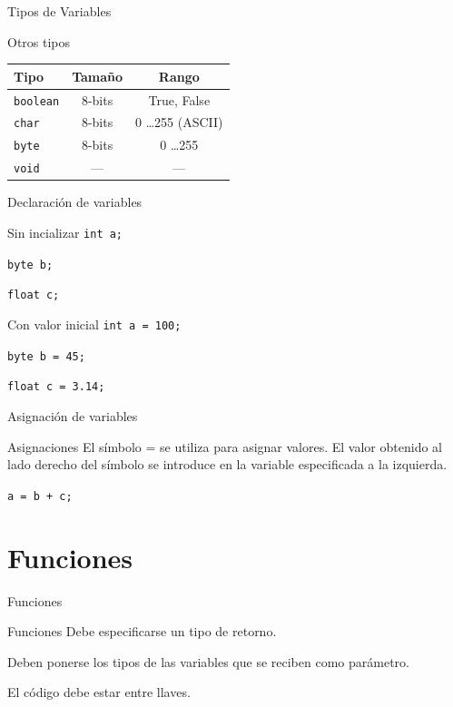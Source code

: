 \documentclass[handout,xcolor=dvipsnames]{beamer}
\newcommand{\pageframe}[1]{\frame{\begin{center}{ \Huge #1 }\end{center}}}
\begin{document}
\begin{frame}{Tipos de Variables}
\begin{block}{Otros tipos}
\begin{center}
 \begin{tabular}{lcc}\hline
 	Tipo	& 	 Tamaño & Rango \\\hline\hline
{\tt boolean} &  8-bits & True, False \\\hline
{\tt char} &  8-bits & 0 \ldots 255 (ASCII) \\\hline
{\tt byte} &  8-bits & 0 \ldots 255 \\\hline
{\tt void} & --- & --- \\\hline
 \end{tabular}
\end{center}
\end{block}
\end{frame}

\begin{frame}{Declaración de variables}
\begin{block}{Sin incializar}
{\tt int a;}

{\tt byte b;}

{\tt float c;}
\end{block}
\begin{block}{Con valor inicial}
{\tt int a = 100;}

{\tt byte b = 45;}

{\tt float c = 3.14;}
\end{block}
\end{frame}

\begin{frame}{Asignación de variables}
  \begin{block}{Asignaciones}
  	El símbolo = se utiliza para asignar valores. El valor obtenido al lado derecho del símbolo se introduce en la variable especificada a la izquierda.
  \end{block}
  \begin{block}
	{\tt a = b + c;}
  \end{block}
\end{frame}

\section{Funciones}

\pageframe{Funciones}


\begin{frame}{Funciones}
  \begin{block}{Funciones}
    Debe especificarse un tipo de retorno.
    
    Deben ponerse los tipos de las variables que se reciben como parámetro.
    
    El código debe estar entre llaves.
  \end{block}
\end{frame}
\end{document}
